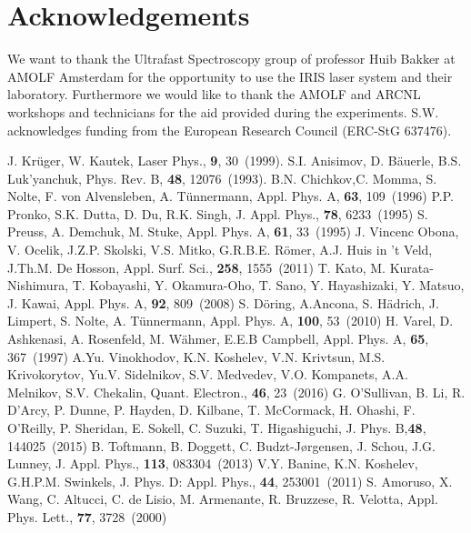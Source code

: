 \documentclass[aip, jap, reprint, amsmath, amssymb]{revtex4-1}
\begin{document}
\section*{Acknowledgements}
We want to thank the Ultrafast Spectroscopy group of professor Huib Bakker at AMOLF Amsterdam for the opportunity to use the IRIS laser system and their laboratory. Furthermore we would like to thank the AMOLF and ARCNL workshops and technicians for the aid provided during the experiments. S.W. acknowledges funding from the European Research Council (ERC-StG 637476).

\begin{thebibliography}{99}
 J. Kr{\"u}ger, W. Kautek, Laser Phys., {\bf 9}, 30~(1999).
 S.I. Anisimov, D. B{\"a}uerle, B.S. Luk'yanchuk, Phys. Rev. B, {\bf 48}, 12076~(1993).
 B.N. Chichkov,C. Momma, S. Nolte, F. von Alvensleben, A. T{\"u}nnermann, Appl. Phys. A, {\bf63}, 109~(1996)
 P.P. Pronko, S.K. Dutta, D. Du, R.K. Singh, J. Appl. Phys., {\bf78}, 6233~(1995)
 S. Preuss, A. Demchuk, M. Stuke, Appl. Phys. A, {\bf61}, 33~(1995)
 J. Vincenc Obona, V. Ocelik, J.Z.P. Skolski, V.S. Mitko, G.R.B.E. R{\"o}mer, A.J. Huis in 't Veld, J.Th.M. De Hosson, Appl. Surf. Sci., {\bf258}, 1555~(2011)
 T. Kato, M. Kurata-Nishimura, T. Kobayashi, Y. Okamura-Oho, T. Sano, Y. Hayashizaki, Y. Matsuo, J. Kawai, Appl. Phys. A, {\bf92}, 809~(2008)
 S. D{\"o}ring, A.Ancona, S. H{\"a}drich, J. Limpert, S. Nolte, A. T{\"u}nnermann, Appl. Phys. A, {\bf100}, 53~(2010)
 H. Varel, D. Ashkenasi, A. Rosenfeld, M. W{\"a}hmer, E.E.B Campbell, Appl. Phys. A, {\bf65}, 367~(1997)
 A.Yu. Vinokhodov, K.N. Koshelev, V.N. Krivtsun, M.S. Krivokorytov, Yu.V. Sidelnikov, S.V. Medvedev, V.O. Kompanets, A.A. Melnikov, S.V. Chekalin, Quant. Electron., {\bf46}, 23~(2016)
 G. {O'Sullivan}, B. Li, R. {D'Arcy}, P. Dunne, P. Hayden, D. Kilbane, T. {McCormack}, H. Ohashi, F. {O'Reilly}, P. Sheridan, E. Sokell, C. Suzuki, T. Higashiguchi, J. Phys. B,{\bf48}, 144025~(2015)
 B. Toftmann, B. Doggett, C. Budzt-J{\o}rgensen, J. Schou, J.G. Lunney, J. Appl. Phys., {\bf113}, 083304~(2013)
 V.Y. Banine, K.N. Koshelev, G.H.P.M. Swinkels, J. Phys. D: Appl. Phys., {\bf44}, 253001~(2011)
 S. Amoruso, X. Wang, C. Altucci, C. de Lisio, M. Armenante, R. Bruzzese, R. Velotta, Appl. Phys. Lett., {\bf77}, 3728~(2000)

\end{thebibliography}
\end{document}
